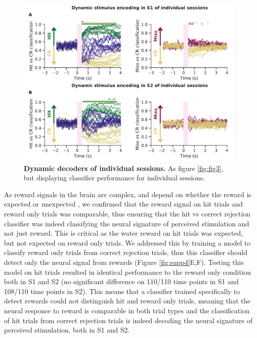 \begin{figure}[!h]
\hspace*{-0.2in}
\includegraphics[scale=0.76]{figures/supplements/Supplementary_Figure5.pdf}
\caption[\textbf{Dynamic decoders of individual sessions}]{\textbf{Dynamic decoders of individual sessions.} As figure \ref{fig:fig3}, but displaying classifier performance for individual sessions.
} 
\label{fig:supp5}
\end{figure}

As reward signals in the brain are complex, and depend on whether the reward is expected or unexpected \cite{schultz_multiple_2000}, we confirmed that the reward signal on hit trials and reward only trials was comparable, thus ensuring that the hit vs correct rejection classifier was indeed classifying the neural signature of perceived stimulation and not just reward. This is critical as the water reward on hit trials was expected, but not expected on reward only trials. We addressed this by training a model to classify reward only trials from correct rejection trials, thus this classifier should detect only the neural signal from rewards (Figure \ref{fig:supp4}E,F). Testing this model on hit trials resulted in identical performance to the reward only condition both in S1 and S2 (no significant difference on 110/110 time points in S1 and 108/110 time points in S2). This means that a classifier trained specifically to detect rewards could not distinguish hit and reward only trials, meaning that the neural response to reward is comparable in both trial types and the classification of hit trials from correct rejection trials is indeed decoding the neural signature of perceived stimulation, both in S1 and S2.


